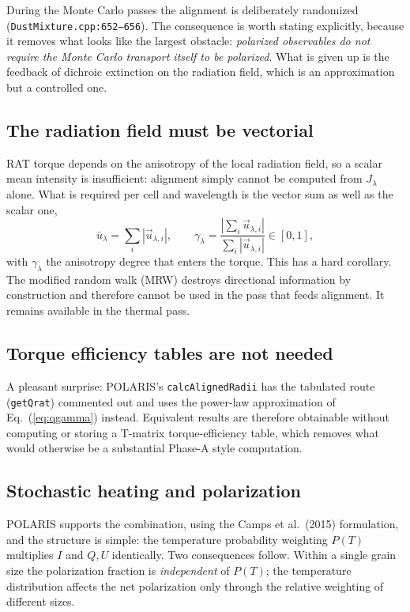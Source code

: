 \documentclass{my_memo}
\newcommand{\code}[1]{\texttt{#1}}
\begin{document}
During the Monte Carlo passes the alignment is deliberately randomized
(\code{DustMixture.cpp:652--656}). The consequence is worth stating
explicitly, because it removes what looks like the largest obstacle:
\emph{polarized observables do not require the Monte Carlo transport
itself to be polarized}. What is given up is the feedback of dichroic
extinction on the radiation field, which is an approximation but a
controlled one.

\subsection{The radiation field must be vectorial}
\label{sec:vecfield}

RAT torque depends on the anisotropy of the local radiation field, so a
scalar mean intensity is insufficient: alignment simply cannot be
computed from $J_\lambda$ alone. What is required per cell and
wavelength is the vector sum as well as the scalar one,
%
\begin{equation}
\bar u_\lambda = \sum_i |\vec u_{\lambda,i}|,\qquad
\gamma_\lambda = \frac{\left|\sum_i \vec u_{\lambda,i}\right|}
                        {\sum_i |\vec u_{\lambda,i}|} \in [0,1],
\label{eq:gammalam}
\end{equation}
%
with $\gamma_\lambda$ the anisotropy degree that enters the torque. This has a hard corollary. The modified
random walk (MRW) destroys directional information by construction and
therefore cannot be used in the pass that feeds alignment. It remains
available in the thermal pass.

\subsection{Torque efficiency tables are not needed}

A pleasant surprise: POLARIS's \code{calcAlignedRadii} has the tabulated
route (\code{getQrat}) commented out and uses the power-law approximation
of Eq.~(\ref{eq:qgamma}) instead. Equivalent results are therefore
obtainable without computing or storing a T-matrix torque-efficiency
table, which removes what would otherwise be a substantial Phase-A style
computation.

\subsection{Stochastic heating and polarization}
\label{sec:stoch}

POLARIS supports the combination, using the Camps et al.\ (2015)
formulation, and the structure is simple: the temperature probability
weighting $P(T)$ multiplies $I$ and $Q,U$ identically. Two consequences
follow. Within a single grain size the polarization fraction is
\emph{independent} of $P(T)$; the temperature distribution affects the net
polarization only through the relative weighting of different sizes.
\end{document}

